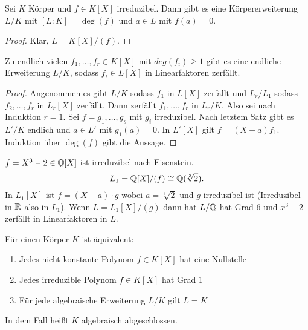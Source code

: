 \begin{Satz}
    Sei $K$ Körper und $f\in K[X]$ irreduzibel. Dann gibt es eine Körpererweiterung $L/K$ mit $[L:K]=\deg(f)$ und $a\in L$ mit $f(a)=0$.
    
\end{Satz}
\begin{proof}
    Klar, $L=K[X]/(f)$.
\end{proof}
\begin{Kor}\label{Kor:ExZerfall}
    Zu endlich vielen $f_1,\dots,f_r\in K[X]$ mit $deg(f_i)\geq 1$ gibt es eine endliche Erweiterung $L/K$, sodass $f_i\in L[X]$ in Linearfaktoren zerfällt.
\end{Kor}
\begin{proof}
    Angenommen es gibt $L/K$ sodass $f_1$ in $L[X]$ zerfällt und $L_r/L_1$ sodass $f_2,\dots,f_r$ in $L_r[X]$ zerfällt. Dann zerfällt $f_1,\dots,f_r$ in $L_r/K$.
    Also sei nach Induktion $r=1$.
    Sei $f=g_1,\dots,g_s$ mit $g_i$ irreduzibel.
    Nach letztem Satz gibt es $L'/K$ endlich und $a\in L'$ mit $g_1(a)=0$.
    In $L'[X]$ gilt $f=(X-a)f_1$.
    Induktion über $\deg(f)$ gibt die Aussage.
\end{proof}
\begin{Bsp}
    $f=X^3-2\in\mathbb{Q}[X]$ ist irreduzibel nach Eisenstein.
    $$L_1=\mathbb{Q}[X]/(f)\cong \mathbb{Q}(\sqrt[3]{2}).$$ In $L_1[X]$ ist $f=(X-a)\cdot g$ wobei $a=\sqrt[3]{2}$ und $g$ irreduzibel ist (Irreduzibel in $\mathbb{R}$ also in $L_1$).
    Wenn $L=L_1[X]/(g)$ dann hat $L/\mathbb{Q}$ hat Grad $6$ und $x^3-2$ zerfällt in Linearfaktoren in $L$.
\end{Bsp}
\begin{Lemma}

 Für einen Körper $K$ ist äquivalent:

\begin{enumerate}

 \item Jedes nicht-konstante Polynom $f\in K[X]$ hat eine Nullstelle

\item Jedes irreduzible Polynom $f\in K[X]$ hat Grad 1

\item Für jede algebraische Erweiterung $L/K$ gilt $L=K$

\end{enumerate}

In dem Fall heißt $K$ algebraisch abgeschlossen.

\end{Lemma}

